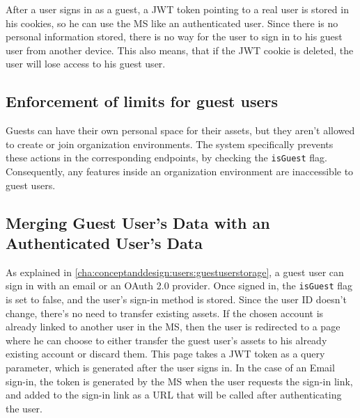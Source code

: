 %
%
%

After a user signs in as a guest, a JWT token pointing to a real user is stored in his
cookies, so he can use the MS like an authenticated user.
Since there is no personal information stored, there is no way for the user to sign in to
his guest user from another device.
This also means, that if the JWT cookie is deleted, the user will lose access to his guest
user.

\subsection{Enforcement of limits for guest users}

Guests can have their own personal space for their assets, but they aren't allowed to create or join organization environments.
The system specifically prevents these actions in the corresponding endpoints, by checking
the \lstinline{isGuest} flag.
Consequently, any features inside an organization environment are inaccessible to guest users.


\subsection{Merging Guest User's Data with an Authenticated User's Data}
\label{cha:ms-architecture:merge-guest-user-data}

As explained in \ref{cha:conceptanddesign:users:guestuserstorage}, a guest user can sign in with an email or an OAuth 2.0 provider.
Once signed in, the \lstinline{isGuest} flag is set to false, and the user’s sign-in method is stored.
Since the user ID doesn't change, there’s no need to transfer existing assets.
If the chosen account is already linked to another user in the MS,
then the user is redirected to a page where he can choose to either transfer the guest user's assets to his 
already existing account or discard them.
This page takes a JWT token as a query parameter, which is generated after the user signs
in.
In the case of an Email sign-in, the token is generated by the MS when the user requests
the sign-in link, and added to the sign-in link as a URL that will be called after
authenticating the user.

